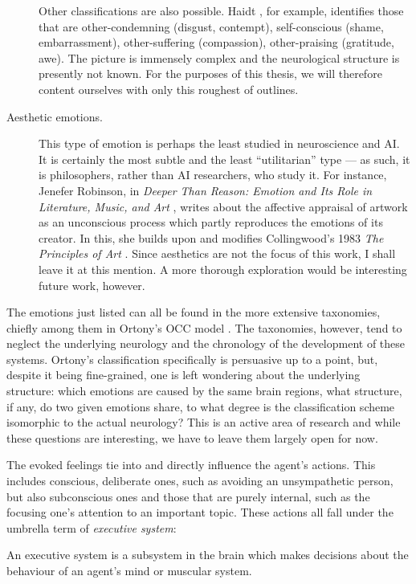 \begin{description}
	Other classifications are also possible. Haidt \cite{haidt2003}, for example, identifies those that are other-condemning (disgust, contempt), self-conscious (shame, embarrassment), other-suffering (compassion), other-praising (gratitude, awe). The picture is immensely complex and the neurological structure is presently not known. For the purposes of this thesis, we will therefore content ourselves with only this roughest of outlines.
	
	\item[Aesthetic emotions.] This type of emotion is perhaps the least studied in neuroscience and AI. It is certainly the most subtle and the least ``utilitarian'' type --- as such, it is philosophers, rather than AI researchers, who study it. For instance, Jenefer Robinson, in {\em Deeper Than Reason: Emotion and Its Role in Literature, Music, and Art} \cite{robinson2005}, writes about the affective appraisal of artwork as an unconscious process which partly reproduces the emotions of its creator. In this, she builds upon and modifies Collingwood's 1983 {\em The Principles of Art} \cite{collingwood1938, SEPcollingwood}. Since aesthetics are not the focus of this work, I shall leave it at this mention. A more thorough exploration would be interesting future work, however.
\end{description}

The emotions just listed can all be found in the more extensive taxonomies, chiefly among them in Ortony's OCC model \cite{ortony1988}. The taxonomies, however, tend to neglect the underlying neurology and the chronology of the development of these systems. Ortony's classification specifically is persuasive up to a point, but, despite it being fine-grained, one is left wondering about the underlying structure: which emotions are caused by the same brain regions, what structure, if any, do two given emotions share, to what degree is the classification scheme isomorphic to the actual neurology? This is an active area of research and while these questions are interesting, we have to leave them largely open for now.

The evoked feelings tie into and directly influence the agent's actions. This includes conscious, deliberate ones, such as avoiding an unsympathetic person, but also subconscious ones and those that are purely internal, such as the focusing one's attention to an important topic. These actions all fall under the umbrella term of {\em executive system}:

\begin{definition}
An executive system is a subsystem in the brain which makes decisions about the behaviour of an agent's mind or muscular system.
\end{definition}

